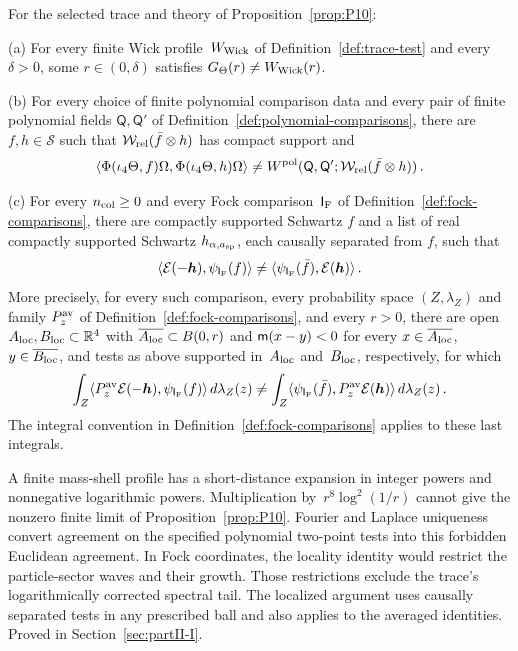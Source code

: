 \begin{proposition}\label{prop:P11}
For the selected trace and theory of Proposition~\ref{prop:P10}:

(a) For every finite Wick profile~$W_{\rm Wick}$ of Definition~\ref{def:trace-test} and every $\delta>0$, some $r\in(0,\delta)$ satisfies $G_{\Theta}(r)\ne W_{\rm Wick}(r)$.

(b) For every choice of finite polynomial comparison data and every pair of finite polynomial fields $\mathsf Q,\mathsf Q'$ of Definition~\ref{def:polynomial-comparisons}, there are $f,h\in\mathcal S$ such that $\mathcal{W}_{\mathrm{rel}}(\bar f\otimes h)$ has compact support and
\begin{equation}\label{eq:P11-1}
\langle\Phi(\iota_4\Theta,f)\Omega,\Phi(\iota_4\Theta,h)\Omega\rangle
\ne W^{\rm pol}(\mathsf Q,\mathsf Q';\mathcal{W}_{\mathrm{rel}}(\bar f\otimes h))\,.
\end{equation}

(c) For every $n_{\rm col}\ge0$ and every Fock comparison~$\mathsf I_{\rm F}$ of Definition~\ref{def:fock-comparisons}, there are compactly supported Schwartz $f$ and a list of real compactly supported Schwartz $h_{\alpha,a_{\rm sp}}$, each causally separated from $f$, such that
\begin{equation}\label{eq:P11-2}
\langle\mathcal E(-\boldsymbol h),\psi_{\mathsf I_{\rm F}}(f)\rangle\ne\langle\psi_{\mathsf I_{\rm F}}(\bar f),\mathcal E(\boldsymbol h)\rangle\,.
\end{equation}
More precisely, for every such comparison, every probability space $(Z,\lambda_Z)$ and family $P_z^{\rm av}$ of Definition~\ref{def:fock-comparisons}, and every $r>0$, there are open $A_{\rm loc},B_{\rm loc}\subset\mathbb{R}^4$ with $\overline{A_{\rm loc}}\subset B(0,r)$ and $\mathsf{m}(x-y)<0$ for every $x\in\overline{A_{\rm loc}}$, $y\in\overline{B_{\rm loc}}$, and tests as above supported in~$A_{\rm loc}$ and~$B_{\rm loc}$, respectively, for which
\begin{equation}\label{eq:P11-3}
\int_Z\langle P_z^{\rm av}\mathcal E(-\boldsymbol h),\psi_{\mathsf I_{\rm F}}(f)\rangle\,d\lambda_Z(z)
\ne\int_Z\langle\psi_{\mathsf I_{\rm F}}(\bar f),P_z^{\rm av}\mathcal E(\boldsymbol h)\rangle\,d\lambda_Z(z)\,.
\end{equation}
The integral convention in Definition~\ref{def:fock-comparisons} applies to these last integrals.
\end{proposition}

A finite mass-shell profile has a short-distance expansion in integer powers
and nonnegative logarithmic powers. Multiplication by~$r^8\log^2(1/r)$ cannot
give the nonzero finite limit of Proposition~\ref{prop:P10}. Fourier and Laplace
uniqueness convert agreement on the specified polynomial two-point tests into
this forbidden Euclidean agreement. In Fock coordinates, the locality identity
would restrict the particle-sector waves and their growth. Those restrictions
exclude the trace's logarithmically corrected spectral tail. The localized
argument uses causally separated tests in any prescribed ball and also applies
to the averaged identities. Proved in Section~\ref{sec:partII-I}.

